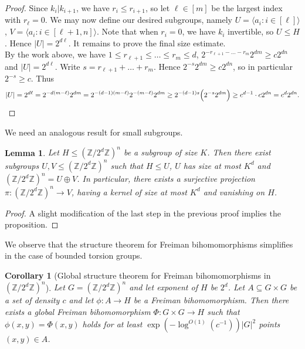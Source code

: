 \documentclass[a4paper,11pt]{article}
\numberwithin{theorem}{section}
\newtheorem{corollary}[theorem]{Corollary}
\newtheorem{lemma}[theorem]{Lemma}
\theoremstyle{definition}
\begin{document}
\begin{proof}
    \indent Since $k_i | k_{i + 1}$, we have $r_i \leq r_{i+1}$, so let $\ell \in [m]$ be the largest index with $r_\ell = 0$. We may now define our desired subgroups, namely $U = \langle a_i : i \in [\ell]\rangle$, $V = \langle a_i : i \in [\ell + 1,n]\rangle$. Note that when $r_i = 0$, we have $k_i$ invertible, so $U \leq H$. Hence $|U| = 2^{d\ell}$. It remains to prove the final size estimate.\\
    \indent By the work above, we have $1\leq r_{\ell + 1} \leq \dots \leq r_m \leq d$, $2^{-r_{\ell + 1} - \dots -r_m} 2^{dm} \geq c 2^{dn}$ and  $|U| = 2^{d\ell}$. Write $s = r_{\ell + 1} + \dots  + r_m$. Hence $2^{-s} 2^{dm} \geq c 2^{dn}$, so in particular $2^{-s} \geq c$. Thus
    \[|U| =2^{d\ell} = 2^{-d(m - \ell)}2^{dm}  = 2^{-(d-1)(m - \ell)} 2^{-(m-\ell)} 2^{dm} \geq 2^{-(d-1)s} \Big(2^{-s} 2^{dm}\Big) \geq c^{d-1} \cdot c 2^{dn} = c^d 2^{dn}.\qedhere\]
\end{proof}

\vspace{\baselineskip}

We need an analogous result for small subgroups.

\begin{lemma}\label{directsummandstorsionextension}
    Let $H \leq (\mathbb{Z}/2^d\mathbb{Z})^n$ be a subgroup of size $K$. Then there exist subgroups $U, V \leq (\mathbb{Z}/2^d\mathbb{Z})^n$ such that $H \leq U$, $U$ has size at most $K^d$ and $(\mathbb{Z}/2^d\mathbb{Z})^n = U \oplus V$. In particular, there exists a surjective projection $\pi : (\mathbb{Z}/2^d\mathbb{Z})^n \to V$, having a kernel of size at most $K^{d}$ and vanishing on $H$.
\end{lemma}

\begin{proof}
    A slight modification of the last step in the previous proof implies the proposition.
\end{proof}

We observe that the structure theorem for Freiman bihomomorphisms simplifies in the case of bounded torsion groups.

\begin{corollary}[Global structure theorem for Freiman bihomomorphisms in $(\mathbb{Z}/2^d\mathbb{Z})^n$]
    \label{maininversetheoremspectorsion}
    Let $G = (\mathbb{Z}/2^d\mathbb{Z})^n$ and let exponent of $H$ be $2^d$. Let $A \subseteq G \times G$ be a set of density $c$ and let $\phi : A \to H$ be a Freiman bihomomorphism. Then there exists a global Freiman bihomomorphism $\Phi : G \times G \to H$ such that $\phi(x,y) = \Phi(x,y)$ holds for at least $\exp(-\log^{O(1)}(c^{-1}))|G|^2$ points $(x,y) \in A$. 
\end{corollary}
\end{document}
